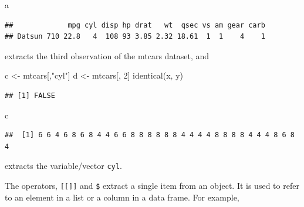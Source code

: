 \documentclass[
  12pt,
  oneside]{book}
\newenvironment{Shaded}{\begin{snugshade}}{\end{snugshade}}
\newcommand{\DecValTok}[1]{\textcolor[rgb]{0.00,0.00,0.81}{#1}}
\newcommand{\FunctionTok}[1]{\textcolor[rgb]{0.00,0.00,0.00}{#1}}
\newcommand{\NormalTok}[1]{#1}
\newcommand{\OtherTok}[1]{\textcolor[rgb]{0.56,0.35,0.01}{#1}}
\newcommand{\SpecialCharTok}[1]{\textcolor[rgb]{0.00,0.00,0.00}{#1}}
\newcommand{\StringTok}[1]{\textcolor[rgb]{0.31,0.60,0.02}{#1}}
\theoremstyle{definition}
\theoremstyle{definition}
\theoremstyle{definition}
\theoremstyle{definition}
\theoremstyle{remark}
\begin{document}
\begin{Shaded}
\begin{Highlighting}[]
\NormalTok{a}
\end{Highlighting}
\end{Shaded}

\begin{verbatim}
##             mpg cyl disp hp drat   wt  qsec vs am gear carb
## Datsun 710 22.8   4  108 93 3.85 2.32 18.61  1  1    4    1
\end{verbatim}

extracts the third observation of the mtcars dataset, and

\begin{Shaded}
\begin{Highlighting}[]
\NormalTok{c }\OtherTok{\textless{}{-}}\NormalTok{ mtcars[,}\StringTok{"cyl"}\NormalTok{]}
\NormalTok{d }\OtherTok{\textless{}{-}}\NormalTok{ mtcars[, }\DecValTok{2}\NormalTok{]}
\FunctionTok{identical}\NormalTok{(x, y)}
\end{Highlighting}
\end{Shaded}

\begin{verbatim}
## [1] FALSE
\end{verbatim}

\begin{Shaded}
\begin{Highlighting}[]
\NormalTok{c}
\end{Highlighting}
\end{Shaded}

\begin{verbatim}
##  [1] 6 6 4 6 8 6 8 4 4 6 6 8 8 8 8 8 8 4 4 4 4 8 8 8 8 4 4 4 8 6 8 4
\end{verbatim}

extracts the variable/vector \texttt{cyl}.

The operators, \texttt{{[}{[}{]}{]}} and \texttt{\$} extract a single item from an object. It is used to refer to an element in a list or a column in a data frame. For example,

\begin{Shaded}
\end{Shaded}
\end{document}
